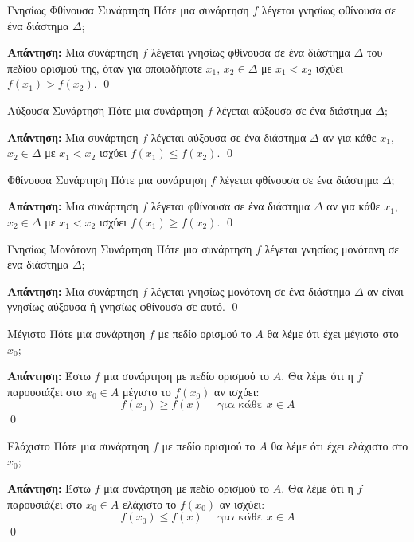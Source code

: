 \documentclass[a4paper, 12pt]{article}
\renewenvironment{proof}[1][\textbf{Απάντηση}]{%
  \par\noindent\textbf{#1:} \rmfamily}{\qed\par}
\begin{document}
\begin{theorem}{Γνησίως Φθίνουσα Συνάρτηση}
  Πότε μια συνάρτηση $f$ λέγεται γνησίως φθίνουσα σε ένα διάστημα $Δ$;
\end{theorem}
\begin{proof}
  Μια συνάρτηση $f$ λέγεται γνησίως φθίνουσα σε ένα διάστημα $Δ$ του πεδίου ορισμού της, όταν για οποιαδήποτε $x_1$, $x_2 \in Δ$ με $x_1 < x_2$ ισχύει $f(x_1) > f(x_2)$.
\end{proof}

\begin{theorem}{Αύξουσα Συνάρτηση}
  Πότε μια συνάρτηση $f$ λέγεται αύξουσα σε ένα διάστημα $Δ$;
\end{theorem}
\begin{proof}
  Μια συνάρτηση $f$ λέγεται αύξουσα σε ένα διάστημα $Δ$ αν για κάθε $x_1$, $x_2 \in Δ$ με $x_1 < x_2$ ισχύει $f(x_1) \leq f(x_2)$.
\end{proof}

\begin{theorem}{Φθίνουσα Συνάρτηση}
  Πότε μια συνάρτηση $f$ λέγεται φθίνουσα σε ένα διάστημα $Δ$;
\end{theorem}
\begin{proof}
  Μια συνάρτηση $f$ λέγεται φθίνουσα σε ένα διάστημα $Δ$ αν για κάθε $x_1$, $x_2 \in Δ$ με $x_1 < x_2$ ισχύει $f(x_1) \geq f(x_2)$.
\end{proof}

\begin{theorem}{Γνησίως Μονότονη Συνάρτηση}
  Πότε μια συνάρτηση $f$ λέγεται γνησίως μονότονη σε ένα διάστημα $Δ$;
\end{theorem}
\begin{proof}
  Μια συνάρτηση $f$ λέγεται γνησίως μονότονη σε ένα διάστημα $Δ$ αν είναι γνησίως αύξουσα ή γνησίως φθίνουσα σε αυτό.
\end{proof}

\begin{theorem}{Μέγιστο}
  Πότε μια συνάρτηση $f$ με πεδίο ορισμού το $A$ θα λέμε ότι έχει μέγιστο στο $x_0$;
\end{theorem}
\begin{proof}
  Έστω $f$ μια συνάρτηση με πεδίο ορισμού το $A$. Θα λέμε ότι η $f$ παρουσιάζει στο $x_0\in Α$ μέγιστο το $f(x_0)$ αν ισχύει:
  $$f(x_0) \geq f(x) \quad \text{ για κάθε } x \in A$$
\end{proof}

\begin{theorem}{Ελάχιστο}
  Πότε μια συνάρτηση $f$ με πεδίο ορισμού το $A$ θα λέμε ότι έχει ελάχιστο στο $x_0$;
\end{theorem}
\begin{proof}
  Έστω $f$ μια συνάρτηση με πεδίο ορισμού το $A$. Θα λέμε ότι η $f$ παρουσιάζει στο $x_0\in Α$ ελάχιστο το $f(x_0)$ αν ισχύει:
  $$f(x_0) \leq f(x) \quad \text{ για κάθε } x \in A$$
\end{proof}
\end{document}
